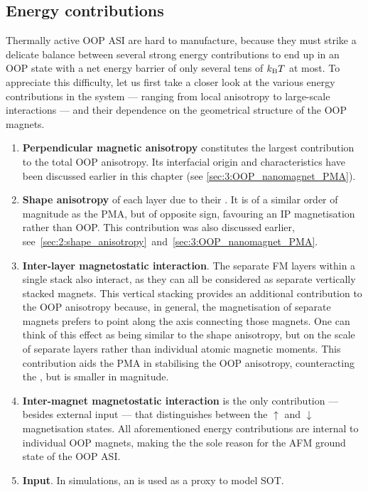 \subsection{Energy contributions} \label{sec:3:E_contributions}
Thermally active OOP ASI are hard to manufacture, because they must strike a delicate balance between several strong energy contributions to end up in an OOP state with a net energy barrier of only several tens of $\kBT$ at most.
To appreciate this difficulty, let us first take a closer look at the various energy contributions in the system --- ranging from local anisotropy to large-scale interactions --- and their dependence on the geometrical structure of the OOP magnets.
\begin{enumerate}
	\item \textbf{Perpendicular magnetic anisotropy} constitutes the largest contribution to the total OOP anisotropy.
	Its interfacial origin and characteristics have been discussed earlier in this chapter (see \cref{sec:3:OOP_nanomagnet_PMA}). %
	\item \textbf{Shape anisotropy} of each layer due to their .
	It is of a similar order of magnitude as the PMA, but of opposite sign, favouring an IP magnetisation rather than OOP.
	This contribution was also discussed earlier, see~\cref{sec:2:shape_anisotropy}~and~\ref{sec:3:OOP_nanomagnet_PMA}. %
	\item \textbf{Inter-layer magnetostatic interaction}.
	The separate FM layers within a single stack also interact, as they can all be considered as separate vertically stacked magnets.
	This vertical stacking provides an additional contribution to the OOP anisotropy because, in general, the magnetisation of separate magnets prefers to point along the axis connecting those magnets.
	One can think of this effect as being similar to the shape anisotropy, but on the scale of separate layers rather than individual atomic magnetic moments.
	This contribution aids the PMA in stabilising the OOP anisotropy, counteracting the , but is smaller in magnitude. %
	\item \textbf{Inter-magnet magnetostatic interaction} is the only contribution --- besides external input --- that distinguishes between the $\uparrow$ and $\downarrow$ magnetisation states.
	All aforementioned energy contributions are internal to individual OOP magnets, making the  the sole reason for the AFM ground state of the OOP ASI. %
	\item \textbf{Input}.
	In simulations, an  is used as a proxy to model SOT.
\end{enumerate}
